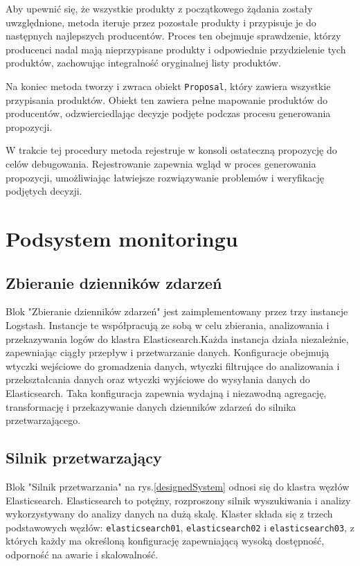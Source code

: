 \begin{itemize}
    Aby upewnić się, że wszystkie produkty z początkowego żądania zostały uwzględnione, metoda iteruje przez pozostałe produkty i przypisuje je do następnych najlepszych producentów. Proces ten obejmuje sprawdzenie, którzy producenci nadal mają nieprzypisane produkty i odpowiednie przydzielenie tych produktów, zachowując integralność oryginalnej listy produktów.
    
    Na koniec metoda tworzy i zwraca obiekt \verb|Proposal|, który zawiera wszystkie przypisania produktów. Obiekt ten zawiera pełne mapowanie produktów do producentów, odzwierciedlając decyzje podjęte podczas procesu generowania propozycji.

    W trakcie tej procedury metoda rejestruje w konsoli ostateczną propozycję do celów debugowania. Rejestrowanie zapewnia wgląd w proces generowania propozycji, umożliwiając łatwiejsze rozwiązywanie problemów i weryfikację podjętych decyzji.
\end{itemize}

\section{Podsystem monitoringu}

\subsection{Zbieranie dzienników zdarzeń}

Blok "Zbieranie dzienników zdarzeń" jest zaimplementowany przez trzy instancje Logstash. Instancje te współpracują ze sobą w celu zbierania, analizowania i przekazywania logów do klastra Elasticsearch.Każda instancja działa niezależnie, zapewniając ciągły przepływ i przetwarzanie danych. Konfiguracje obejmują wtyczki wejściowe do gromadzenia danych, wtyczki filtrujące do analizowania i przekształcania danych oraz wtyczki wyjściowe do wysyłania danych do Elasticsearch. Taka konfiguracja zapewnia wydajną i niezawodną agregację, transformację i przekazywanie danych dzienników zdarzeń do silnika przetwarzającego.

\subsection{Silnik przetwarzający}

Blok "Silnik przetwarzania" na rys.\ref{designedSystem} odnosi się do klastra węzłów Elasticsearch. Elasticsearch to potężny, rozproszony silnik wyszukiwania i analizy wykorzystywany do analizy danych na dużą skalę. Klaster składa się z trzech podstawowych węzłów: \verb|elasticsearch01|, \verb|elasticsearch02| i \verb|elasticsearch03|, z których każdy ma określoną konfigurację zapewniającą wysoką dostępność, odporność na awarie i skalowalność.

